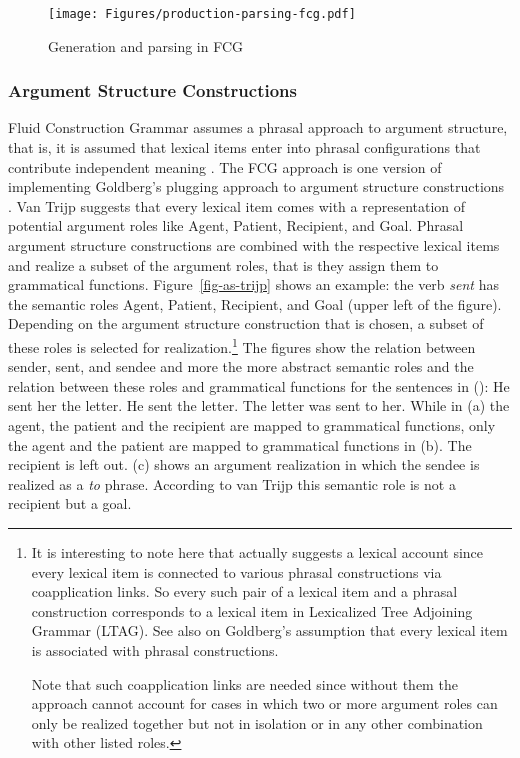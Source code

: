 \begin{figure}
\texttt{[image: Figures/production-parsing-fcg.pdf]}
\caption{\label{fig-matching-merging-trijp}Generation and parsing in FCG \citep[]{vanTrijp2013a}}
\end{figure}%

\subsubsection{Argument Structure Constructions}

\largerpage[3]
Fluid Construction Grammar assumes a phrasal approach to argument structure, that is, it is assumed that lexical items enter
into phrasal configurations that contribute independent meaning \citep{vanTrijp2011a}. The FCG
approach is one version of implementing Goldberg's plugging approach to argument structure
constructions \citep{Goldberg95a}. Van Trijp suggests that every lexical item comes with a representation of
potential argument roles like Agent, Patient, Recipient, and Goal. Phrasal argument structure
constructions are combined with the respective lexical items and realize a subset of the argument
roles, that is they assign them to grammatical functions. Figure~\ref{fig-as-trijp} shows an
example: the verb \emph{sent} has the semantic roles Agent, Patient, Recipient, and Goal  (upper left
of the figure). Depending
on the argument structure construction that is chosen, a subset of these roles is selected for
realization.\footnote{%
  It is interesting to note here that \citet[]{vanTrijp2011a} actually suggests a lexical
  account since every lexical item is connected to various phrasal constructions via coapplication
  links. So every such pair of a lexical item and a phrasal construction corresponds to a lexical
  item in Lexicalized Tree Adjoining Grammar (LTAG). See also  on
  Goldberg's assumption that every lexical item is associated with phrasal constructions.

Note that such coapplication links are needed since without them the approach cannot account for
cases in which two or more argument roles can only be realized together but not in isolation or in
any other combination with other listed roles.
}
\pagebreak
The figures show the relation between sender, sent, and sendee and more the more abstract semantic
roles and the relation between these roles and grammatical functions for the sentences in ():
\eal
\ex He sent her the letter.
\ex He sent the letter.
\ex The letter was sent to her.
\zl
While in (a) the agent, the patient and the recipient are mapped to grammatical functions,
only the agent and the patient are mapped to grammatical functions in (b). The recipient is
left out. (c) shows an argument realization in which the sendee is realized as a \emph{to}
  phrase. According to van Trijp this semantic role is not a recipient but a goal. 


